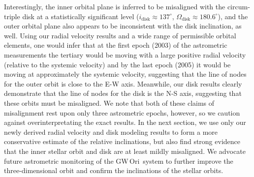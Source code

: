 \documentclass[twocolumn]{aastex61}
\newcommand{\gw}{GW\,Ori}
\begin{document}
Interestingly, the inner orbital plane is inferred to be misaligned with the circum-triple disk at a statistically significant level ($i_\mathrm{disk} \approx 137^\circ$, $\Omega_\mathrm{disk} \approx 180.6^\circ$), and the outer orbital plane also appears to be inconsistent with the disk inclination, as well. Using our radial velocity results and a wide range of permissible orbital elements, one would infer that at the first epoch (2003) of the \citet{berger11} astrometric measurements the tertiary would be moving with a large positive radial velocity (relative to the systemic velocity) and by the last epoch (2005) it would be moving at approximately the systemic velocity, suggesting that the line of nodes for the outer orbit is close to the E-W axis. Meanwhile, our disk results clearly demonstrate that the line of nodes for the disk is the N-S axis, suggesting that these orbits must be misaligned. We note that both of these claims of misalignment rest upon only three astrometric epochs, however, so we caution against overinterpretating the exact results. In the next section, we use only our newly derived radial velocity and disk modeling results to form a more conservative estimate of the relative inclinations, but also find strong evidence that the inner stellar orbit and disk are at least mildly misaligned. We advocate future astrometric monitoring of the \gw\ system to further improve the three-dimensional orbit and confirm the inclinations of the stellar orbits.
\end{document}
